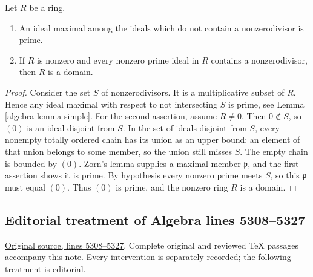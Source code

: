 \begin{lemma}
\label{editorial-source-lemma-characterize-domain}
Let $R$ be a ring.
\begin{enumerate}
\item An ideal maximal among the ideals which do not contain a
nonzerodivisor is prime.
\item If $R$ is nonzero and every nonzero prime ideal in $R$
contains a nonzerodivisor, then $R$ is a domain.
\end{enumerate}
\end{lemma}

\begin{proof}
Consider the set $S$ of nonzerodivisors. It is a multiplicative
subset of $R$. Hence any ideal maximal with respect to not intersecting
$S$ is prime, see
Lemma \ref{algebra-lemma-simple}.
For the second assertion, assume $R\ne0$. Then $0\notin S$,
so $(0)$ is an ideal disjoint from $S$. In the set of ideals disjoint
from $S$, every nonempty totally ordered chain has its union as an
upper bound: an element of that union belongs to some member, so
the union still misses $S$. The empty chain is bounded by $(0)$.
Zorn's lemma supplies a maximal member $\mathfrak p$, and the first
assertion shows it is prime. By hypothesis every nonzero prime
meets $S$, so this $\mathfrak p$ must equal $(0)$.
Thus $(0)$ is prime, and the nonzero ring $R$ is a domain.
\end{proof}


\subsection{Editorial treatment of Algebra lines 5308--5327}

\hypertarget{algebra-context-032}{}

\noindent\href{https://github.com/stacks/stacks-project/blob/a04446e57ec1fbc252a871afcec7752fb2807b14/algebra.tex\#L5308}{Original source, lines 5308--5327}. Complete original and reviewed TeX passages accompany this note. Every intervention is separately recorded; the following treatment is editorial.


